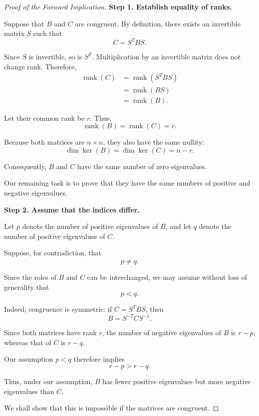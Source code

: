 \documentclass[11pt]{article}
\theoremstyle{definition}
\theoremstyle{remark}
\begin{document}
\begin{proof}[Proof of the Forward Implication]


\textbf{Step 1. Establish equality of ranks.}

Suppose that $B$ and $C$ are congruent.
By definition, there exists an invertible
matrix $S$ such that
\[
    \boxed{C=S^TBS}.
\]

Since $S$ is invertible, so is $S^T$.
Multiplication by an invertible matrix
does not change rank. Therefore,
\[
\begin{aligned}
    \operatorname{rank}(C)
    &=\operatorname{rank}(S^TBS)\\
    &=\operatorname{rank}(BS)\\
    &=\operatorname{rank}(B).
\end{aligned}
\]

Let their common rank be $r$. Thus,
\[
    \boxed{
    \operatorname{rank}(B)
    =\operatorname{rank}(C)=r.
    }
\]

Because both matrices are $n\times n$,
they also have the same nullity:
\[
    \dim\ker(B)=\dim\ker(C)=n-r.
\]

Consequently, $B$ and $C$ have the same
number of zero eigenvalues.

Our remaining task is to prove that they
have the same numbers of positive and
negative eigenvalues.

\medskip

\textbf{Step 2. Assume that the indices differ.}

Let $p$ denote the number of positive
eigenvalues of $B$, and let $q$ denote
the number of positive eigenvalues of $C$.

Suppose, for contradiction, that
\[
    p\neq q.
\]

Since the roles of $B$ and $C$ can be
interchanged, we may assume without
loss of generality that
\[
    \boxed{p<q}.
\]

Indeed, congruence is symmetric: if
$C=S^TBS$, then
\[
    B=S^{-T}CS^{-1}.
\]

Since both matrices have rank $r$,
the number of negative eigenvalues of
$B$ is $r-p$, whereas that of $C$
is $r-q$.

Our assumption $p<q$ therefore implies
\[
    r-p>r-q.
\]

Thus, under our assumption, $B$ has
fewer positive eigenvalues but more
negative eigenvalues than $C$.

We shall show that this is impossible
if the matrices are congruent.


\end{proof}
\end{document}
